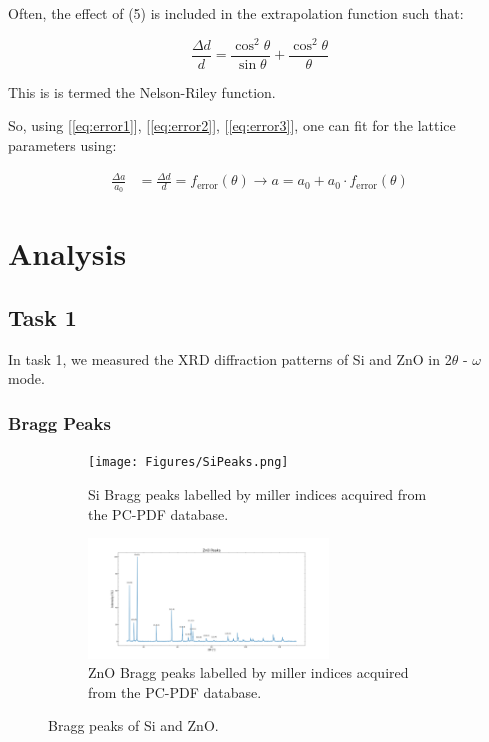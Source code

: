 \documentclass{article}
\begin{document}
Often, the effect of (5) is included in the extrapolation function such that:
 
\begin{equation}
	\label{eq:error3}
	\frac{\Delta d}{d} = \frac{\cos^2 \theta}{\sin \theta} + \frac{\cos^2 \theta}{\theta}
\end{equation}

This is is termed the Nelson-Riley function. \cite{bernarddeniscullity_2015_elements}

So, using [\ref{eq:error1}], [\ref{eq:error2}], [\ref{eq:error3}], one can fit for the lattice parameters using:

\begin{align*}
	\label{eq:fit}
	\frac{\Delta a}{a_0} &= \frac{\Delta d}{d} = f_{\text{error}}(\theta)
	\rightarrow a = a_0 + a_0 \cdot f_{\text{error}}(\theta)
\end{align*}
\pagebreak{}

\section{Analysis}

\subsection{Task 1}
\label{subsection:Task1}

In task 1, we measured the XRD diffraction patterns of Si and ZnO in 2$\theta$ - $\omega$ mode.

\subsubsection{Bragg Peaks}

\begin{figure}[h]
	\centering
	\begin{subfigure}{\textwidth}
		\centering
		\texttt{[image: Figures/SiPeaks.png]}
		\caption{Si Bragg peaks labelled by miller indices acquired from the PC-PDF database.}
		\label{fig:SiPeaks}
	\end{subfigure}

	\begin{subfigure}{\textwidth}
		\centering
		\includegraphics[width=0.7\textwidth]{Figures/ZnOPeaks.png}
		\caption{ZnO Bragg peaks labelled by miller indices acquired from the PC-PDF database.}
		\label{fig:ZnOPeaks}
	\end{subfigure}
	\caption{Bragg peaks of Si and ZnO.}
	\label{fig:BraggPeaks}
\end{figure}
\end{document}
